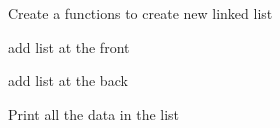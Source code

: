 
\begin{DoxyItemize}
\item Create a functions to create new linked list
\item add list at the front
\item add list at the back
\item Print all the data in the list 
\end{DoxyItemize}
